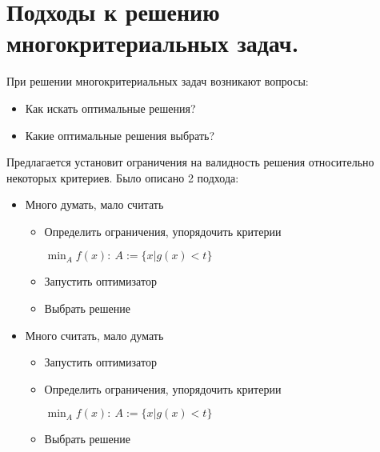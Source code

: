 \section{Подходы к решению многокритериальных задач.}

При решении многокритериальных задач возникают вопросы:
\begin{itemize}
    \item Как искать оптимальные решения?
    \item Какие оптимальные решения выбрать?
\end{itemize}

Предлагается установит ограничения на валидность решения
относительно некоторых критериев. Было описано 2 подхода:
\begin{itemize}
    \item Много думать, мало считать
    \begin{itemize}
        \item Определить ограничения, упорядочить критерии
        
        $\min_A f(x):\ A := \{x | g(x) < t\}$
        \item Запустить оптимизатор
        \item Выбрать решение
    \end{itemize}
    \item Много считать, мало думать
    \begin{itemize}
        \item Запустить оптимизатор
        \item Определить ограничения, упорядочить критерии
        
        $\min_A f(x):\ A := \{x | g(x) < t\}$
        \item Выбрать решение
    \end{itemize}
\end{itemize}
